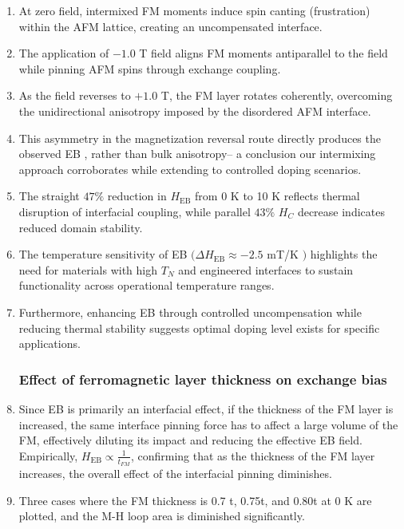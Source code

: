 \begin{enumerate}
    \item At zero field, intermixed FM moments induce spin canting (frustration) within the AFM lattice, creating an uncompensated interface.
    \item The application of $-1.0$ T field aligns FM moments antiparallel to the field while pinning AFM spins through exchange coupling.
    \item As the field reverses to $+1.0$ T, the FM layer rotates coherently, overcoming the unidirectional anisotropy imposed by the disordered AFM interface.
    \item This asymmetry in the magnetization reversal route directly produces the observed EB \cite{influenceofinterfacial2011}, rather than bulk anisotropy-- a conclusion our intermixing approach corroborates while extending to controlled doping scenarios.
    \item The straight $47\%$ reduction in $H_{\mathrm{EB}}$ from 0 K to 10 K reflects thermal disruption of interfacial coupling, while parallel $43\%$ $H_C$ decrease indicates reduced domain stability.
    \item The temperature sensitivity of EB $(\Delta H_{\mathrm{EB}}\approx-2.5$ mT/K $)$ highlights the need for materials with high $T_N$ and engineered interfaces to sustain functionality across operational temperature ranges.
    \item Furthermore, enhancing EB through controlled uncompensation while reducing thermal stability suggests optimal doping level exists for specific applications.
    \subsubsection*{Effect of ferromagnetic layer thickness on exchange bias}
    \item Since EB is primarily an interfacial effect, if the thickness of the FM layer is increased, the same interface pinning force has to affect a large volume of the FM, effectively diluting its impact and reducing the effective EB field. Empirically, $H_{\mathrm{EB}}\propto\frac{1}{t_{FM}}$, confirming that as the thickness of the FM layer increases, the overall effect of the interfacial pinning diminishes.
    \item Three cases where the FM thickness is 0.7 t, 0.75t, and 0.80t at 0 K are plotted, and the M-H loop area is diminished significantly.
\end{enumerate}

